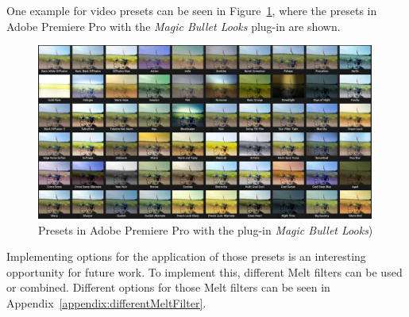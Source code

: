 \documentclass[../MasterThesis.tex]{subfiles}
\begin{document}
One example for video presets can be seen in Figure~\ref{figure:app}, where the presets in Adobe Premiere Pro with the \textit{Magic Bullet Looks} plug-in are shown.

\begin{figure}[H]
	
	\centering
	
	\includegraphics[width=0.99\textwidth]{app.png}
	
	\caption[Presets in Adobe Premiere Pro (\textit{Magic Bullet Looks})]{Presets in Adobe Premiere Pro with the plug-in \textit{Magic Bullet Looks})}
	\label{figure:app}
	
\end{figure}

Implementing options for the application of those presets is an interesting opportunity for future work. To implement this, different Melt filters can be used or combined. Different options for those Melt filters can be seen in Appendix~\ref{appendix:differentMeltFilter}.




	
	
	
\end{document}
